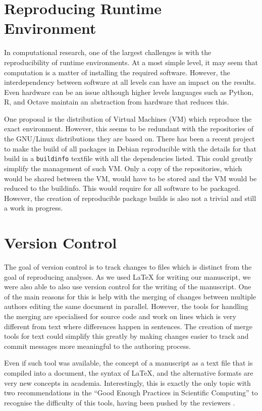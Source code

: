 \section{Reproducing Runtime Environment}

In computational research, one of the largest challenges
is with the reproducibility of
runtime environments.  At a most simple level, it may seem that
computation is a
matter of installing the required software.  However, the
interdependency between software at all levels can have an impact on
the results.  Even hardware can be an issue although higher levels
languages such as Python, R, and Octave maintain an abstraction from
hardware that reduces this.

One proposal is the distribution of Virtual Machines (VM) which
reproduce the exact environment.  However, this seems to be redundant with
the repositories of the GNU/Linux distributions they are based on.
There has been a recent project to make the build of all packages in
Debian reproducible with the details for that build in a
\texttt{buildinfo} textfile with all the dependencies listed.
This could greatly simplify the management of such VM.  Only
a copy of the repositories, which would be shared between the VM, would
have to be stored and the VM would be reduced to the buildinfo.
This would require for all software to be packaged.
However, the creation of reproducible package builds is also not a trivial and
still a work in progress.

\section{Version Control}

The goal of version control is to track changes to files which is
distinct from the goal of reproducing analyses.  As we used \LaTeX{} for
writing our manuscript, we were also able to also use version control for
the writing of the manuscript.  One of the main reasons for this
is help with the merging of changes between multiple authors
editing the same document in parallel.  However, the tools for
handling the merging are specialised for source code and work on
lines which is very different from text where differences
happen in sentences.  The creation of merge tools for text could
simplify this greatly by making changes easier to track and commit
messages more meaningful to the authoring process.

Even if such tool was available, the concept of a manuscript as a text
file that is compiled into a document, the syntax of \LaTeX, and the
alternative formats are very new concepts in academia.  Interestingly, this is
exactly the only topic with two recommendations in the ``Good Enough
Practices in Scientific Computing'' to recognise the difficulty of
this tools, having been pushed by the reviewers .

